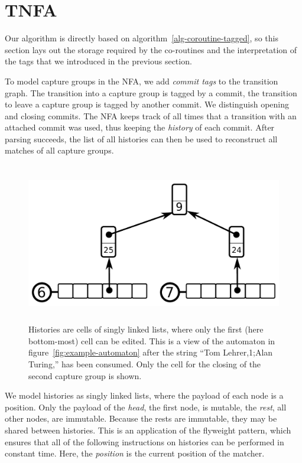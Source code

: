 \documentclass[11pt,a4paper,twoside,openright]{Thesis}
\theoremstyle{definition}
\newcommand{\Figref}[1]{figure~\ref{fig:#1}}
\newcommand{\seclabel}[1]{\label{sec:#1}}
\begin{document}
\section{TNFA}	\seclabel{tnfa}

Our algorithm is directly based on algorithm~\ref{alg-coroutine-tagged}, so 
this section lays out the storage required by the co-routines and the
interpretation of the tags that we introduced in the previous section.

To model capture groups in the NFA, we add \emph{commit tags} to
the transition graph. The transition into a capture group is tagged
by a commit, the transition to leave a capture group is tagged by
another commit. We distinguish opening and closing commits. The
NFA keeps track of all times that a transition with an attached
commit was used, thus keeping the \emph{history} of each commit.
After parsing succeeds, the list of all histories can then be used
to reconstruct all matches of all capture groups.

\begin{figure}[htpb]
  \centering
  \includegraphics[height=7cm]{graphs/cells}
  \caption{Histories are cells of singly linked lists, where only the first 
    (here bottom-most) cell can be edited. This is a view of the automaton in 
    \Figref{example-automaton} after the string ``Tom Lehrer,1;Alan 
  Turing,'' has been consumed. Only the cell for the closing of the second 
capture group is shown.}
  \label{fig:cells}
\end{figure}

We model histories as singly linked lists, where the payload of each node is a
position.  Only the payload of the \emph{head}, the first node, is mutable, the
\emph{rest}, all other nodes, are immutable.  Because the rests are immutable,
they may be shared between histories.  This is an application of the flyweight
pattern, which ensures that all of the following instructions on histories can
be performed in constant time. Here, the \emph{position} is the current
position of the matcher.
\end{document}
